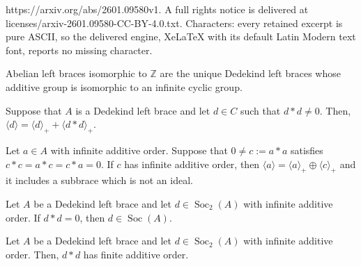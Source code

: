 \documentclass[10pt,a4paper]{amsart}
\DeclareMathOperator{\Soc}{Soc}
\begin{document}
https://arxiv.org/abs/2601.09580v1. A full rights notice is delivered at licenses/arxiv-2601.09580-CC-BY-4.0.txt. Characters: every retained excerpt is pure ASCII, so the delivered engine, XeLaTeX with its default Latin Modern text font, reports no missing character.
\begin{proposicio}
\label{prop:dedekindbraces-Z}
Abelian left braces isomorphic to $\mathbb{Z}$ are the unique Dedekind left braces whose additive group is isomorphic to an infinite cyclic group.
\end{proposicio}

\begin{lema}
\label{lema:dastd-nozero+Dededkind-><d>=<d>+<dastd>}
Suppose that $A$ is a Dedekind left brace and let  $d \in C$ such that $d \ast d \neq 0$. Then, $\langle d \rangle = \langle d \rangle_+ + \langle d\ast d \rangle_+$.  %
\end{lema}

\begin{lema}
\label{lema:infiniteorder->subbridanoideal}
Let $a\in A$ with infinite additive order. Suppose that $0 \neq c:= a \ast a$ satisfies $c \ast c = a \ast c = c \ast a = 0$. If $c$ has infinite additive order, then $\langle a \rangle = \langle a \rangle_+ \oplus \langle c \rangle_+$ and it includes a subbrace which is not an ideal.
\end{lema}

\begin{lema}
\label{lema:dinSoc2+order-inf+dastd=0->dinS}
Let $A$ be a Dedekind left brace and let $d\in \Soc_2(A)$ with infinite additive order. If $d \ast d = 0$, then $d \in \Soc(A)$.
\end{lema}

\begin{lema}
\label{lema:2.3nou}
Let $A$ be a Dedekind left brace and let $d\in \Soc_2(A)$ with infinite additive order. Then, $d \ast d$ has finite additive order.
\end{lema}
\end{document}
